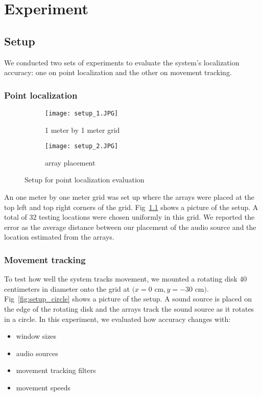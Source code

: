 \chapter{Experiment}
\section{Setup}


We conducted two sets of experiments to evaluate the system's localization accuracy: one on point localization and the other on movement tracking. 

\subsection{Point localization}

\begin{figure}[]
  \centering
  \begin{subfigure}[]{.48\textwidth}
    \texttt{[image: setup\_1.JPG]}
    \caption{1 meter by 1 meter grid}
  \end{subfigure}
  \begin{subfigure}[]{.48\textwidth}
    \texttt{[image: setup\_2.JPG]}
    \caption{array placement}
  \end{subfigure}
  \caption{Setup for point localization evaluation}
  \label{fig:setup_point}
\end{figure}

An one meter by one meter grid was set up where the arrays were placed at the top left and top right corners of the grid. Fig~\ref{fig:setup_point} shows a picture of the setup. A total of $32$ testing locations were chosen uniformly in this grid. We reported the error as the average distance between our placement of the audio source and the location estimated from the arrays.

\subsection{Movement tracking}
To test how well the system tracks movement, we mounted a rotating disk $40$ centimeters in diameter onto the grid at $(x=0$ cm$, y=-30$ cm$)$. Fig~\ref{fig:setup_circle} shows a picture of the setup. A sound source is placed on the edge of the rotating disk and the arrays track the sound source as it rotates in a circle. In this experiment, we evaluated how accuracy changes with:
\begin{itemize}
\item window sizes
\item audio sources
\item movement tracking filters
\item movement speeds
\end{itemize}

